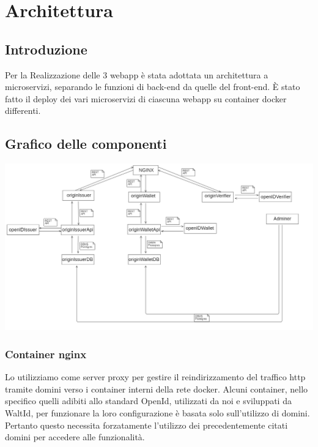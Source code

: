 \section{Architettura}

\subsection{Introduzione}
Per la Realizzazione delle 3 webapp è stata adottata un architettura a microservizi, separando le funzioni di back-end da quelle del front-end. È stato fatto il deploy dei vari microservizi di ciascuna webapp su container docker differenti.
\subsection{Grafico delle componenti}

\includegraphics[scale = 0.3]{./res/img/microservizi.png}


\subsubsection{Container \textbf{nginx}}
Lo utilizziamo come server proxy per gestire il reindirizzamento del traffico http tramite domini verso i container interni della rete docker. Alcuni container, nello specifico quelli adibiti allo standard OpenId, utilizzati da noi e sviluppati da WaltId, per funzionare la loro configurazione è basata solo sull'utilizzo di domini. Pertanto questo necessita forzatamente l'utilizzo dei precedentemente citati domini per accedere alle funzionalità.  
